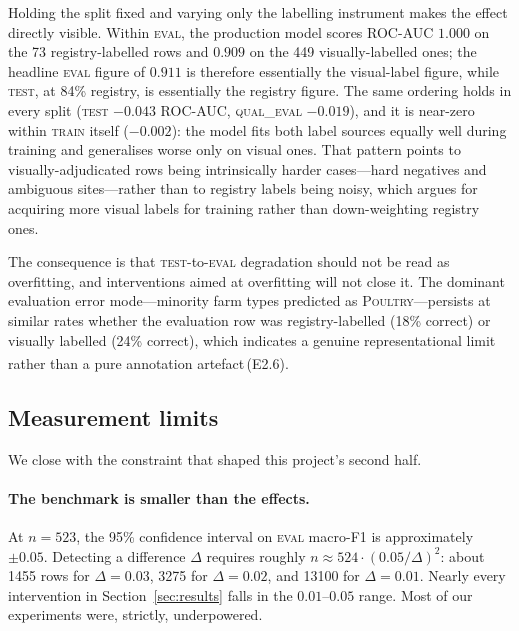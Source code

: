 \documentclass[11pt,a4paper]{article}
\newcommand{\unablated}[1]{\textsuperscript{\dag}\,(#1)}
\begin{document}
Holding the split fixed and varying only the labelling instrument makes the
effect directly visible. Within \textsc{eval}, the production model scores
ROC-AUC $1.000$ on the 73 registry-labelled rows and $0.909$ on the 449
visually-labelled ones; the headline \textsc{eval} figure of $0.911$ is therefore
essentially the visual-label figure, while \textsc{test}, at 84\% registry, is
essentially the registry figure. The same ordering holds in every split
(\textsc{test} $-0.043$ ROC-AUC, \textsc{qual\_eval} $-0.019$), and it is
near-zero within \textsc{train} itself ($-0.002$): the model fits both label
sources equally well during training and generalises worse only on visual ones.
That pattern points to visually-adjudicated rows being intrinsically harder
cases---hard negatives and ambiguous sites---rather than to registry labels being
noisy, which argues for acquiring more visual labels for training rather than
down-weighting registry ones.

The consequence is that \textsc{test}-to-\textsc{eval} degradation should not be
read as overfitting, and interventions aimed at overfitting will not close it.
The dominant evaluation error mode---minority farm types predicted as
\textsc{Poultry}---persists at similar rates whether the evaluation row was
registry-labelled (18\% correct) or visually labelled (24\% correct), which
indicates a genuine representational limit rather than a pure annotation
artefact\unablated{E2.6}.

\subsection{Measurement limits}
\label{sec:measurement}

We close with the constraint that shaped this project's second half.

\paragraph{The benchmark is smaller than the effects.} At $n=523$, the 95\%
confidence interval on \textsc{eval} macro-F1 is approximately $\pm0.05$.
Detecting a difference $\Delta$ requires roughly $n \approx 524 \cdot
(0.05/\Delta)^2$: about \num{1455} rows for $\Delta = 0.03$, \num{3275} for
$\Delta = 0.02$, and \num{13100} for $\Delta = 0.01$. Nearly every intervention
in Section~\ref{sec:results} falls in the $0.01$--$0.05$ range. Most of our
experiments were, strictly, underpowered.
\end{document}

